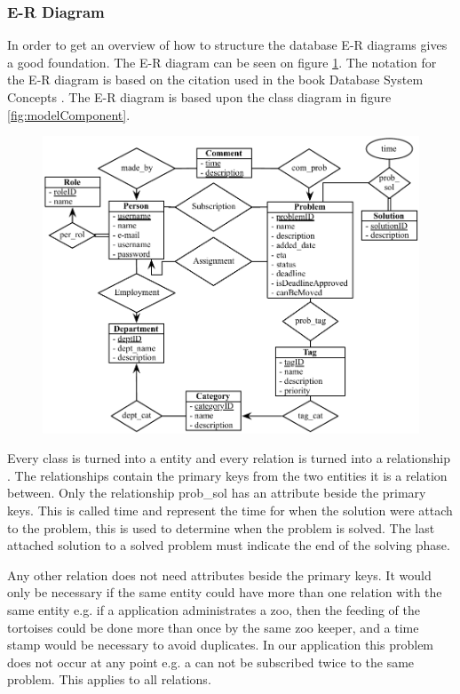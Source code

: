 \newcommand{\erdiagram}[1][]{E-R diagram}
\subsubsection{E-R Diagram}
In order to get an overview of how to structure the database \erdiagram[]s gives a good foundation.
The \erdiagram[] can be seen on figure \ref{fig:er_diagram}.
The notation for the \erdiagram[] is based on the citation used in the book Database System Concepts \cite[p. 305]{Sudershan2011}. 
The \erdiagram[] is based upon the class diagram in figure \ref{fig:modelComponent}. 

\begin{figure}[h]
	\centering
		\includegraphics[scale=0.8]{input/component_design/ER-diagram.pdf}
	\label{fig:er_diagram}
\end{figure}

Every class is turned into a entity and every relation is turned into a relationship \cite[p. 259 - 321]{Sudershan2011}.
The relationships contain the primary keys from the two entities it is a relation between.
Only the relationship prob\_sol has an attribute beside the primary keys.
This is called time and represent the time for when the solution were attach to the problem, this is used to determine when the problem is solved.
The last attached solution to a solved problem must indicate the end of the solving phase. 

Any other relation does not need attributes beside the primary keys.
It would only be necessary if the same entity could have more than one relation with the same entity e.g. if a application administrates a zoo, then the feeding of the tortoises could be done more than once by the same zoo keeper, and a time stamp would be necessary to avoid duplicates.
In our application this problem does not occur at any point e.g. a \client[] can not be subscribed twice to the same problem.
This applies to all relations. 

